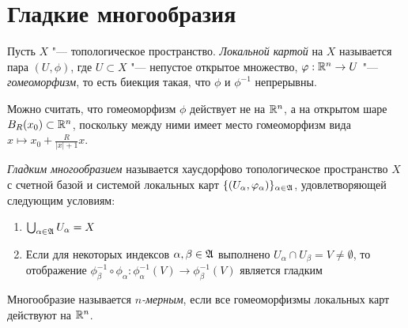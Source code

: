 \section{Гладкие многообразия}

\begin{definition}
	Пусть $X$ "--- топологическое пространство. \textit{Локальной картой} на $X$ называется пара $(U, \phi)$, где $U \subset X$ "--- непустое открытое множество, $\varphi: \mathbb{R}^n \to U$ "--- \textit{гомеоморфизм}, то есть биекция такая, что $\phi$ и $\phi^{-1}$ непрерывны.
\end{definition}

\begin{note}
	Можно считать, что гомеоморфизм $\phi$ действует не на $\mathbb{R}^n$, а на открытом шаре $B_R(x_0) \subset \mathbb{R}^n$, поскольку между ними имеет место гомеоморфизм вида $x \mapsto x_0 + \frac R{|x| + 1}x$.
\end{note}

\begin{definition}
	\textit{Гладким многообразием} называется хаусдорфово топологическое пространство $X$ с счетной базой и системой локальных карт $\{(U_\alpha, \varphi_\alpha)\}_{\alpha \in \mathfrak A}$, удовлетворяющей следующим условиям:
	\begin{enumerate}
		\item $\bigcup_{\alpha \in \mathfrak A}U_\alpha = X$
		\item Если для некоторых индексов $\alpha, \beta \in \mathfrak A$ выполнено $U_\alpha \cap U_\beta = V \ne \emptyset$, то отображение $\phi_\beta^{-1} \circ \phi_\alpha : \phi_\alpha^{-1}(V) \to \phi_\beta^{-1}(V)$ является гладким
	\end{enumerate}
	
	Многообразие называется \textit{$n$-мерным}, если все гомеоморфизмы локальных карт действуют на $\mathbb{R}^n$.
\end{definition}

